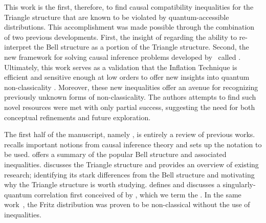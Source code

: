 \documentclass[aps, 10pt, english, twoside, pra, nofootinbib, tightenlines, longbibliography, superscriptaddress]{revtex4-1}
\begin{document}
    This work is the first, therefore, to find causal compatibility inequalities for the Triangle structure that are known to be violated by quantum-accessible distributions. This accomplishment was made possible through the combination of two previous developments. First, the insight of \citet{Fritz_2012} regarding the ability to re-interpret the Bell structure as a portion of the Triangle structure. Second, the new framework for solving causal inference problems developed by~\citet{Inflation} called . Ultimately, this work serves as a validation that the Inflation Technique is efficient and sensitive enough at low orders to offer new insights into quantum non-classicality \cite{Navascues_2017}. Moreover, these new inequalities offer an avenue for recognizing previously unknown forms of non-classicality. The authors attempts to find such novel resources were met with only partial success, suggesting the need for both conceptual refinements and future exploration.

    The first half of the manuscript, namely , is entirely a review of previous works.  recalls important notions from causal inference theory and sets up the notation to be used.  offers a summary of the popular Bell structure and associated inequalities.  discusses the Triangle structure and provides an overview of existing research; identifying its stark differences from the Bell structure and motivating why the Triangle structure is worth studying.  defines and discusses a singularly-quantum correlation first conceived of by \citet{Fritz_2012}, which we term the . In the same work~\cite{Fritz_2012}, the Fritz distribution was proven to be non-classical without the use of inequalities.
\end{document}
